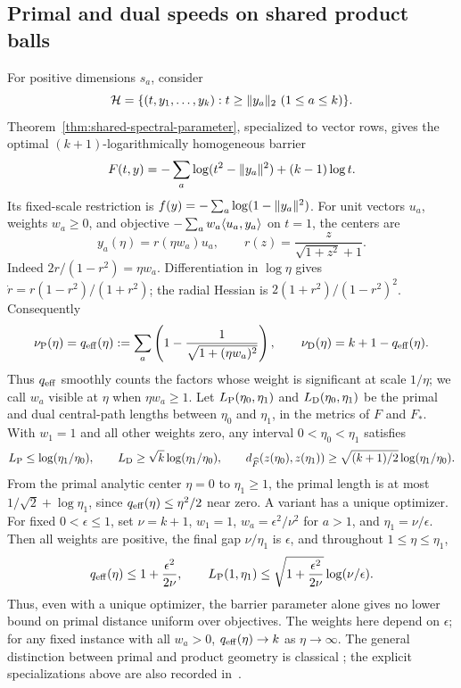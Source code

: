 \subsection{Primal and dual speeds on shared product balls}
For positive dimensions $s_a$, consider
\[
 \mathcal H=\{(t,y_1,\ldots,y_k):t\geq\lVert y_a\rVert_2\ (1\leq a\leq k)\}.
\]
Theorem~\ref{thm:shared-spectral-parameter}, specialized to vector rows,
gives the optimal $(k+1)$-logarithmically homogeneous barrier
\begin{equation}\label{eq:pd-product-barrier}
 F(t,y)=-\sum_a\log(t^2-\lVert y_a\rVert^2)+(k-1)\log t.
\end{equation}
Its fixed-scale restriction is $f(y)=-\sum_a\log(1-\lVert y_a\rVert^2)$.
For unit vectors $u_a$, weights $w_a\geq0$, and objective
$-\sum_a w_a\langle u_a,y_a\rangle$ on $t=1$, the centers are
\begin{equation}\label{eq:pd-product-centers}
 y_a(\eta)=r(\eta w_a)u_a,\qquad
 r(z)=\frac{z}{\sqrt{1+z^2}+1}.
\end{equation}
Indeed $2r/(1-r^2)=\eta w_a$. Differentiation in $\log\eta$ gives
$\dot r=r(1-r^2)/(1+r^2)$; the radial Hessian is
$2(1+r^2)/(1-r^2)^2$. Consequently
\begin{equation}\label{eq:pd-product-effective}
 \nu_{\rm P}(\eta)=q_{\rm eff}(\eta)
 :=\sum_a\left(1-\frac1{\sqrt{1+(\eta w_a)^2}}\right),\qquad
 \nu_{\rm D}(\eta)=k+1-q_{\rm eff}(\eta).
\end{equation}
Thus $q_{\rm eff}$ smoothly counts the factors whose weight is
significant at scale $1/\eta$; we call $w_a$ visible at $\eta$ when $\eta w_a\geq1$.
Let $L_{\rm P}(\eta_0,\eta_1)$ and $L_{\rm D}(\eta_0,\eta_1)$ be the
primal and dual central-path lengths between $\eta_0$ and $\eta_1$, in
the metrics of $F$ and $F_*$.
With $w_1=1$ and all other weights zero, any interval
$0<\eta_0<\eta_1$ satisfies
\[
 L_{\rm P}\leq\log(\eta_1/\eta_0),\qquad
 L_{\rm D}\geq\sqrt{k}\log(\eta_1/\eta_0),\qquad
 d_{\widehat F}(z(\eta_0),z(\eta_1))
 \geq\sqrt{(k+1)/2}\log(\eta_1/\eta_0).
\]
From the primal analytic center $\eta=0$ to $\eta_1\geq1$, the primal
length is at most $1/\sqrt2+\log\eta_1$, since
$q_{\rm eff}(\eta)\leq\eta^2/2$ near zero.
A variant has a unique optimizer. For fixed
$0<\epsilon\leq1$, set $\nu=k+1$, $w_1=1$,
$w_a=\epsilon^2/\nu^2$ for $a>1$, and $\eta_1=\nu/\epsilon$.
Then all weights are positive, the final gap $\nu/\eta_1$ is
$\epsilon$, and throughout $1\leq\eta\leq\eta_1$,
\[
 q_{\rm eff}(\eta)\leq1+\frac{\epsilon^2}{2\nu},\qquad
 L_{\rm P}(1,\eta_1)
 \leq\sqrt{1+\frac{\epsilon^2}{2\nu}}\log(\nu/\epsilon).
\]
Thus, even with a unique optimizer, the barrier parameter alone gives
no lower bound on primal distance uniform over objectives. The weights here depend on $\epsilon$; for any fixed
instance with all $w_a>0$, $q_{\rm eff}(\eta)\to k$ as $\eta\to\infty$.
The general distinction between primal and product geometry is classical
\cite{NT2002,NesterovNemirovski2008}; the explicit specializations above
are also recorded in~\cite[Section~9]{CentralPathCompanion}.


